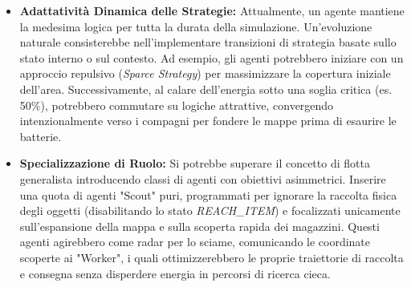 \documentclass[11pt,a4paper]{article}
\begin{document}
\begin{itemize}
    \item \textbf{Adattatività Dinamica delle Strategie:} Attualmente, un agente mantiene la medesima logica per tutta la durata della simulazione. Un'evoluzione naturale consisterebbe nell'implementare transizioni di strategia basate sullo stato interno o sul contesto. Ad esempio, gli agenti potrebbero iniziare con un approccio repulsivo (\textit{Sparce Strategy}) per massimizzare la copertura iniziale dell'area. Successivamente, al calare dell'energia sotto una soglia critica (es. 50\%), potrebbero commutare su logiche attrattive, convergendo intenzionalmente verso i compagni per fondere le mappe prima di esaurire le batterie.
    
    \item \textbf{Specializzazione di Ruolo:} Si potrebbe superare il concetto di flotta generalista introducendo classi di agenti con obiettivi asimmetrici. Inserire una quota di agenti "Scout" puri, programmati per ignorare la raccolta fisica degli oggetti (disabilitando lo stato \textit{REACH\_ITEM}) e focalizzati unicamente sull'espansione della mappa e sulla scoperta rapida dei magazzini. Questi agenti agirebbero come radar per lo sciame, comunicando le coordinate scoperte ai "Worker", i quali ottimizzerebbero le proprie traiettorie di raccolta e consegna senza disperdere energia in percorsi di ricerca cieca.
\end{itemize}
\end{document}
